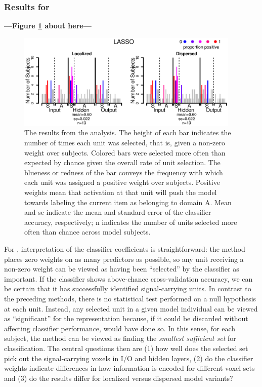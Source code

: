 \subsubsection{Results for {\lasso}}

\begin{center}
\textbf{---Figure \ref{fig.lasso} about here---}
\end{center}

\begin{figure}
\centering
\includegraphics[width=0.95\textwidth]{figures/figure6.eps}
\caption{The results from the {\lasso} analysis. The height of each bar indicates the number of times each unit was selected, that is, given a non-zero weight over subjects. Colored bars were selected more often than expected by chance given the overall rate of unit selection. The blueness or redness of the bar conveys the frequency with which each unit was assigned a positive weight over subjects. Positive weights mean that activation at that unit will push the model towards labeling the current item as belonging to domain A. Mean and se indicate the mean and standard error of the classifier accuracy, respectively; n indicates the number of units selected more often than chance across model subjects.}
\label{fig.lasso} 
\end{figure}

For {\lasso}, interpretation of the classifier coefficients is straightforward: the method places zero weights on as many predictors as possible, so any unit receiving a non-zero weight can be viewed as having been ``selected'' by the classifier as important. If the classifier shows above-chance cross-validation accuracy, we can be certain that it has successfully identified signal-carrying units. In contrast to the preceding methods, there is no statistical test performed on a null hypothesis at each unit. Instead, any selected unit in a given model individual can be viewed as ``significant'' for the representation because, if it could be discarded without affecting classifier performance, {\lasso} would have done so. In this sense, for each subject, the method can be viewed as finding the {\em smallest sufficient set} for classification. The central questions then are (1) how well does the selected set pick out the signal-carrying voxels in I/O and hidden layers, (2) do the classifier weights indicate differences in how information is encoded for different voxel sets and (3) do the results differ for localized versus dispersed model variants?

